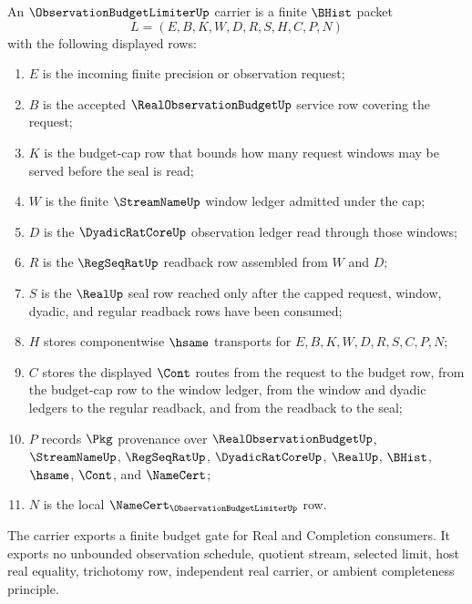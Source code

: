 \begin{definition}
\label{def:observation-budget-limiter-carrier}
An $\ObservationBudgetLimiterUp$ carrier is a finite $\BHist$ packet
$$
L=(E,B,K,W,D,R,S,H,C,P,N)
$$
with the following displayed rows:
\begin{enumerate}
\item $E$ is the incoming finite precision or observation request;
\item $B$ is the accepted $\RealObservationBudgetUp$ service row covering the request;
\item $K$ is the budget-cap row that bounds how many request windows may be served before the seal is read;
\item $W$ is the finite $\StreamNameUp$ window ledger admitted under the cap;
\item $D$ is the $\DyadicRatCoreUp$ observation ledger read through those windows;
\item $R$ is the $\RegSeqRatUp$ readback row assembled from $W$ and $D$;
\item $S$ is the $\RealUp$ seal row reached only after the capped request, window, dyadic, and regular readback rows have been consumed;
\item $H$ stores componentwise $\hsame$ transports for $E,B,K,W,D,R,S,C,P,N$;
\item $C$ stores the displayed $\Cont$ routes from the request to the budget row, from the budget-cap row to the window ledger, from the window and dyadic ledgers to the regular readback, and from the readback to the seal;
\item $P$ records $\Pkg$ provenance over $\RealObservationBudgetUp$, $\StreamNameUp$, $\RegSeqRatUp$, $\DyadicRatCoreUp$, $\RealUp$, $\BHist$, $\hsame$, $\Cont$, and $\NameCert$;
\item $N$ is the local $\NameCert_{\ObservationBudgetLimiterUp}$ row.
\end{enumerate}
The carrier exports a finite budget gate for Real and Completion consumers. It exports no unbounded observation schedule, quotient stream, selected limit, host real equality, trichotomy row, independent real carrier, or ambient completeness principle.
\end{definition}

